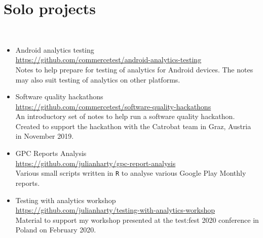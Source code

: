 \section{Solo projects}~\label{sec:solo-projects}
\begin{itemize}
    \item Android analytics testing\\ \url{https://github.com/commercetest/android-analytics-testing}\\ Notes to help prepare for testing of analytics for Android devices. The notes may also suit testing of analytics on other platforms.

    \item Software quality hackathons\\ \url{https://github.com/commercetest/software-quality-hackathons}\\ An introductory set of notes to help run a software quality hackathon. Created to support the hackathon with the Catrobat team in Graz, Austria in November 2019. 
    \item GPC Reports Analysis\\ \url{https://github.com/julianharty/gpc-report-analysis}\\ Various small scripts written in \texttt{R} to analyse various Google Play Monthly reports.
    
    \item Testing with analytics workshop\\ \url{https://github.com/julianharty/testing-with-analytics-workshop}\\ Material to support my workshop presented at the test:fest 2020 conference in Poland on  February 2020.
\end{itemize}

